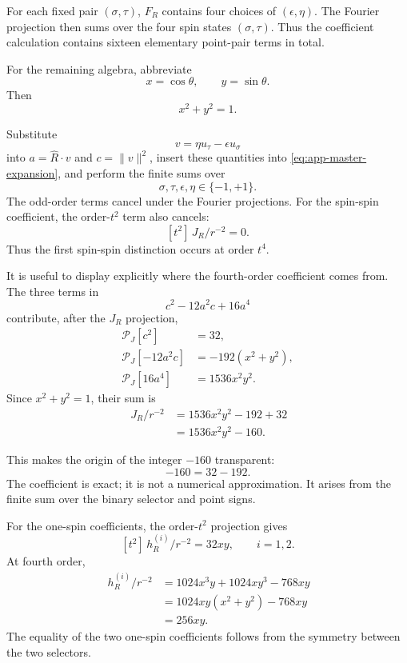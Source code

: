 \documentclass[12pt,a4paper]{article}
\newcommand{\norm}[1]{\lVert #1\rVert}
\begin{document}
For each fixed pair $(\sigma,\tau)$, $F_R$ contains four choices of
$(\epsilon,\eta)$.  The Fourier projection then sums over the four
spin states $(\sigma,\tau)$.  Thus the coefficient calculation
contains sixteen elementary point-pair terms in total.

For the remaining algebra, abbreviate
\[
x=\cos\theta,
\qquad
y=\sin\theta.
\]
Then
\[
x^2+y^2=1.
\]

Substitute
\[
v=\eta u_\tau-\epsilon u_\sigma
\]
into $a=\widehat R\cdot v$ and $c=\norm v^2$, insert these quantities
into \eqref{eq:app-master-expansion}, and perform the finite sums over
\[
\sigma,\tau,\epsilon,\eta\in\{-1,+1\}.
\]
The odd-order terms cancel under the Fourier projections.  For the
spin-spin coefficient, the order-$t^2$ term also cancels:
\[
[t^2]\,J_R/r^{-2}=0.
\]
Thus the first spin-spin distinction occurs at order $t^4$.

It is useful to display explicitly where the fourth-order coefficient
comes from.  The three terms in
\[
c^2-12a^2c+16a^4
\]
contribute, after the $J_R$ projection,
\begin{align}
\mathcal P_J[c^2]
&=32,
\label{eq:app-Jpiece1}\\
\mathcal P_J[-12a^2c]
&=-192(x^2+y^2),
\label{eq:app-Jpiece2}\\
\mathcal P_J[16a^4]
&=1536x^2y^2.
\label{eq:app-Jpiece3}
\end{align}
Since $x^2+y^2=1$, their sum is
\begin{align}
[t^4]\,J_R/r^{-2}
&=
1536x^2y^2-192+32
\nonumber\\
&=
1536x^2y^2-160.
\label{eq:app-Jxy}
\end{align}

This makes the origin of the integer $-160$ transparent:
\[
-160=32-192.
\]
The coefficient is exact; it is not a numerical approximation.  It
arises from the finite sum over the binary selector and point signs.

For the one-spin coefficients, the order-$t^2$ projection gives
\begin{equation}
\label{eq:app-h2}
[t^2]\,h_R^{(i)}/r^{-2}
=
32xy,
\qquad i=1,2.
\end{equation}
At fourth order,
\begin{align}
[t^4]\,h_R^{(i)}/r^{-2}
&=
1024x^3y+1024xy^3-768xy
\nonumber\\
&=
1024xy(x^2+y^2)-768xy
\nonumber\\
&=
256xy.
\label{eq:app-h4}
\end{align}
The equality of the two one-spin coefficients follows from the
symmetry between the two selectors.
\end{document}
